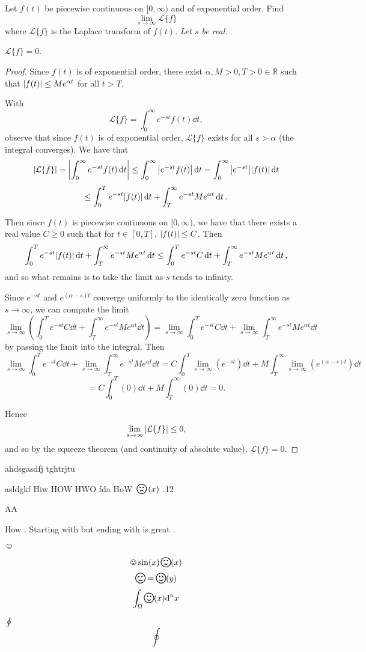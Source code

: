 \documentclass[11pt]{article}
\newcommand{\happy}{\raisebox{-.28em}{\resizebox{1.5em}{!}{\smiley}}}
\newcommand{\darkhappy}{\raisebox{-.28em}{\resizebox{1.5em}{!}{\blacksmiley}}}
\newcommand{\sad}{\raisebox{-.28em}{\resizebox{1.5em}{!}{\frownie}}}
\DeclareMathOperator{\mathhappy}{\!\happy\!}
\newcommand{\br}[1]{\left(#1\right)}
\newcommand{\sbr}[1]{\left[#1\right]}
\newcommand{\cbr}[1]{\{#1\}}
\begin{document}
Let $f(t)$ be piecewise continuous on $[0,\infty)$ and of exponential order. Find $$\lim_{s\to \infty}\mathcal{L}\{f\}$$ where $\mathcal{L}\{f\}$ is the Laplace transform of $f(t)$. \textit{Let $s$ be real.}\vspace{1cm}

$\mathcal{L}\cbr{f} = 0$.

\begin{proof}
Since $f(t)$ is of exponential order, there exist $\alpha, M>0, T>0 \in\mathbb{R}$ such that $\abs{f(t)}\leq Me^{\alpha{t}}$ for all $t>T$.

With $$\mathcal{L}\cbr{f} = \int_0^{\infty}e^{-st}f(t)\dd{t},$$ observe that since $f(t)$ is of exponential order, $\mathcal{L}\cbr{f}$ exists for all $s>\alpha$ (the integral converges). We have that $$\abs{\mathcal{L}\cbr{f}} = \abs{\int_0^{\infty}e^{-st}f(t)\dd{t}} \leq \int_0^{\infty}\abs{e^{-st}f(t)}\dd{t} = \int_0^{\infty}\abs{e^{-st}}\abs{f(t)}\dd{t}$$ $$\leq \int_0^{T}e^{-st}\abs{f(t)}\dd{t} + \int_T^{\infty}e^{-st}Me^{\alpha t}\dd{t}.$$

Then since $f(t)$ is piecewise continuous on $[0,\infty)$, we have that there exists a real value $C\geq 0$ such that for $t\in\sbr{0,T}$, $\abs{f(t)}\leq C$. Then $$\int_0^{T}e^{-st}\abs{f(t)}\dd{t} + \int_T^{\infty}e^{-st}Me^{\alpha t}\dd{t} \leq \int_0^{T}e^{-st} C\dd{t} + \int_T^{\infty}e^{-st}Me^{\alpha t}\dd{t},$$ and so what remains is to take the limit as $s$ tends to infinity.

Since $e^{-st}$ and $e^{(\alpha -s)t}$ converge uniformly to the identically zero function as $s\to \infty$, we can compute the limit $$\lim_{s\to\infty} \br{\int_0^{T}e^{-st} C\dd{t} + \int_T^{\infty}e^{-st}Me^{\alpha t}\dd{t}} = \lim_{s\to\infty}\int_0^{T}e^{-st} C\dd{t} + \lim_{s\to\infty}\int_T^{\infty}e^{-st}Me^{\alpha t}\dd{t}$$ by passing the limit into the integral. Then $$\lim_{s\to\infty}\int_0^{T}e^{-st} C\dd{t} + \lim_{s\to\infty}\int_T^{\infty}e^{-st}Me^{\alpha t}\dd{t} = C\int_0^{T}\lim_{s\to\infty}\br{e^{-st}} \dd{t} + M\int_T^{\infty}\lim_{s\to\infty}\br{e^{(\alpha-s)t}}\dd{t}$$ $$= C\int_0^T \br{0}\dd{t} + M\int_T^{\infty}\br{0}\dd{t} = 0.$$

Hence $$\lim_{s\to \infty} \abs{\mathcal{L}\cbr{f}}\leq 0,$$ and so by the squeeze theorem (and continuity of absolute value), $\mathcal{L}\cbr{f} = 0$.
\end{proof}

ahdsgasdfj \smiley
tghtrjtu \frownie

asldgkf Hiw \happy HOW HWO fda HoW $\sad(x)$ \sad.12

A\sad A

How \sad.
Starting with \sad but ending with \happy is great \darkhappy.

$\smiley$

\[\smiley\sin(x)\mathhappy(x)\]
\[\mathhappy = \mathhappy(y)\]
\[ \int_\Omega\mathhappy(x)\dd^n{x}\]
\smiley

\darkhappy \happy

$\oint$ \[\oint\]
\end{document}
